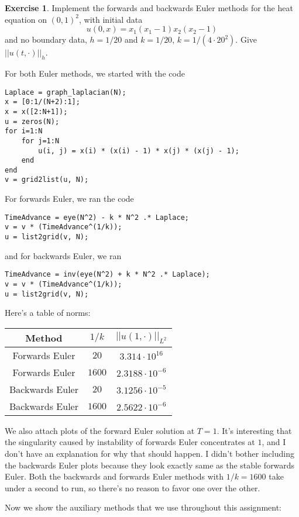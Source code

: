\documentclass[10pt]{article}
\theoremstyle{definition}
\newtheorem{exer}{Exercise}
\begin{document}
\begin{exer}
Implement the forwards and backwards Euler methods for the heat equation on $(0, 1)^2$, with initial data
$$u(0, x) = x_1(x_1 - 1)x_2(x_2 - 1)$$
and no boundary data, $h = 1/20$ and $k = 1/20$, $k = 1/(4 \cdot 20^2)$.
Give $||u(t, \cdot)||_h$.
\end{exer}

For both Euler methods, we started with the code

\begin{verbatim}
Laplace = graph_laplacian(N);
x = [0:1/(N+2):1];
x = x([2:N+1]);
u = zeros(N);
for i=1:N
    for j=1:N
        u(i, j) = x(i) * (x(i) - 1) * x(j) * (x(j) - 1);
    end
end
v = grid2list(u, N);
\end{verbatim}

For forwards Euler, we ran the code
\begin{verbatim}
TimeAdvance = eye(N^2) - k * N^2 .* Laplace;
v = v * (TimeAdvance^(1/k));
u = list2grid(v, N);
\end{verbatim}
and for backwards Euler, we ran
\begin{verbatim}
TimeAdvance = inv(eye(N^2) + k * N^2 .* Laplace);
v = v * (TimeAdvance^(1/k));
u = list2grid(v, N);
\end{verbatim}

Here's a table of norms:
\begin{center}\begin{tabular}{c | c | c}
Method & $1/k$ & $||u(1, \cdot)||_{L^2}$ \\
\hline
Forwards Euler & $20$ & $3.314 \cdot 10^{16}$ \\
Forwards Euler & $1600$ & $2.3188 \cdot 10^{-6}$ \\
Backwards Euler & $20$ & $3.1256 \cdot 10^{-5}$ \\
Backwards Euler & $1600$ & $2.5622 \cdot 10^{-6}$ \\
\end{tabular}\end{center}
We also attach plots of the forward Euler solution at $T = 1$.
It's interesting that the singularity caused by instability of forwards Euler concentrates at $1$, and I don't have an explanation for why that should happen.
I didn't bother including the backwards Euler plots because they look exactly same as the stable forwards Euler.
Both the backwards and forwards Euler methods with $1/k = 1600$ take under a second to run, so there's no reason to favor one over the other.

Now we show the auxiliary methods that we use throughout this assignment:
\end{document}
